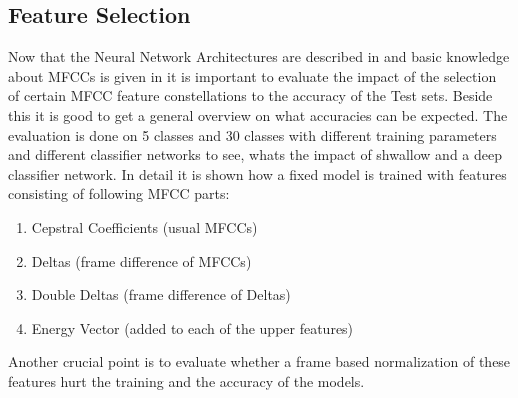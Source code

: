 
\subsection{Feature Selection}
Now that the Neural Network Architectures are described in  and basic knowledge about MFCCs is given in  it is important to evaluate the impact of the selection of certain MFCC feature constellations to the accuracy of the Test sets.
Beside this it is good to get a general overview on what accuracies can be expected.
The evaluation is done on 5 classes and 30 classes with different training parameters and different classifier networks to see, whats the impact of shwallow and a deep classifier network.
In detail it is shown how a fixed model is trained with features consisting of following MFCC parts:
\begin{enumerate}
    \item Cepstral Coefficients (usual MFCCs)
    \item Deltas (frame difference of MFCCs)
    \item Double Deltas (frame difference of Deltas)
    \item Energy Vector (added to each of the upper features)
\end{enumerate}
Another crucial point is to evaluate whether a frame based normalization of these features hurt the training and the accuracy of the models.




